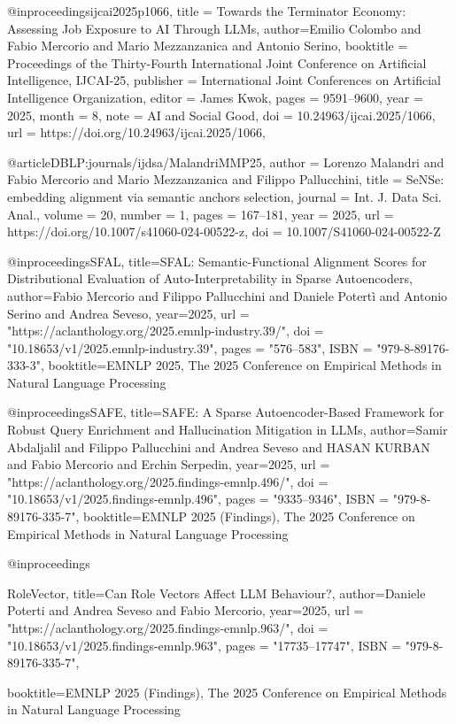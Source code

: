 @inproceedings{ijcai2025p1066,
  title     = {Towards the Terminator Economy: Assessing Job Exposure to AI Through LLMs},
   author={Emilio Colombo and Fabio Mercorio and Mario Mezzanzanica and Antonio Serino},
  booktitle = {Proceedings of the Thirty-Fourth International Joint Conference on
               Artificial Intelligence, {IJCAI-25}},
  publisher = {International Joint Conferences on Artificial Intelligence Organization},
  editor    = {James Kwok},
  pages     = {9591--9600},
  year      = {2025},
  month     = {8},
  note      = {AI and Social Good},
  doi       = {10.24963/ijcai.2025/1066},
  url       = {https://doi.org/10.24963/ijcai.2025/1066},
}

@article{DBLP:journals/ijdsa/MalandriMMP25,
  author       = {Lorenzo Malandri and Fabio Mercorio and Mario Mezzanzanica and Filippo Pallucchini},
  title        = {SeNSe: embedding alignment via semantic anchors selection},
  journal      = {Int. J. Data Sci. Anal.},
  volume       = {20},
  number       = {1},
  pages        = {167--181},
  year         = {2025},
  url          = {https://doi.org/10.1007/s41060-024-00522-z},
  doi          = {10.1007/S41060-024-00522-Z}
}



@inproceedings{SFAL,
      title={SFAL: Semantic-Functional Alignment Scores for Distributional Evaluation of Auto-Interpretability in Sparse Autoencoders}, 
      author={Fabio Mercorio and Filippo Pallucchini and Daniele Potertì and Antonio Serino and Andrea Seveso},
      year={2025},
      url = "https://aclanthology.org/2025.emnlp-industry.39/",
    doi = "10.18653/v1/2025.emnlp-industry.39",
    pages = "576--583",
    ISBN = "979-8-89176-333-3",
      booktitle={EMNLP 2025, The 2025 Conference on Empirical Methods in Natural Language Processing} 
}

@inproceedings{SAFE,
      title={SAFE: A Sparse Autoencoder-Based Framework for Robust Query Enrichment and Hallucination Mitigation in LLMs}, 
      author={Samir Abdaljalil and Filippo Pallucchini and Andrea Seveso and HASAN KURBAN and Fabio Mercorio and Erchin Serpedin},
      year={2025},
      url = "https://aclanthology.org/2025.findings-emnlp.496/",
    doi = "10.18653/v1/2025.findings-emnlp.496",
    pages = "9335--9346",
    ISBN = "979-8-89176-335-7",
      booktitle={EMNLP 2025 (Findings), The 2025 Conference on Empirical Methods in Natural Language Processing} 
}


@inproceedings{RoleVector,
      title={Can Role Vectors Affect LLM Behaviour?}, 
      author={Daniele Poterti and Andrea Seveso and Fabio Mercorio},
      year={2025},
      url = "https://aclanthology.org/2025.findings-emnlp.963/",
    doi = "10.18653/v1/2025.findings-emnlp.963",
    pages = "17735--17747",
    ISBN = "979-8-89176-335-7",
    
      booktitle={EMNLP 2025 (Findings), The 2025 Conference on Empirical Methods in Natural Language Processing} 
}


